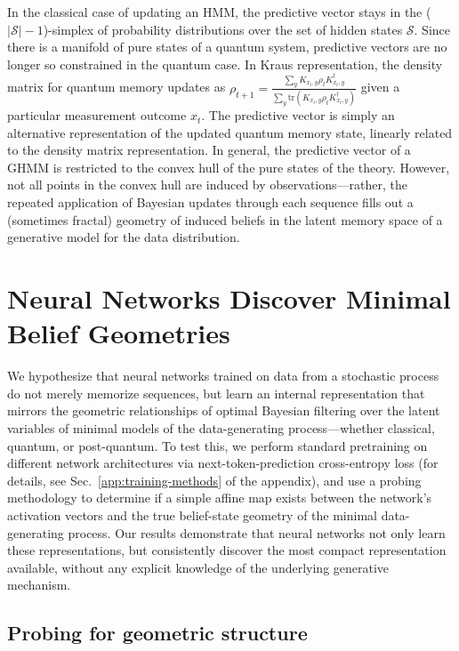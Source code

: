 \documentclass[prx,nofootinbib,onecolumn,showkeys,groupaddress,preprintnumbers,floatfix,
superscriptaddress]{revtex4-1}
\newcommand{\tr}{\text{tr}}
\begin{document}
In the classical case of updating an HMM, the predictive vector stays in the ($|\mathcal{S}|-1$)-simplex of probability distributions over the set of hidden states $\mathcal{S}$.
Since there %
is a manifold of
pure states of a quantum system,
predictive vectors are no longer so constrained in the quantum case.  In Kraus representation, the density matrix for quantum memory updates as 
$\rho_{t+1} = \frac{\sum_y K_{x_t, y} \rho_t K_{x_t, y}^\dagger}{\sum_y \tr( K_{x_t, y} \rho_t K_{x_t, y}^\dagger)}$ given a particular measurement outcome $x_t$.  The predictive vector is simply an alternative representation of the updated quantum memory state, linearly related to the density matrix representation.
In general, the predictive vector of a GHMM is restricted to the convex hull of the pure states of the theory.  However, not all points in the convex hull are induced by observations---rather, the repeated application of Bayesian updates through each sequence fills out a (sometimes fractal) geometry of induced beliefs
in the latent memory space
of a generative model 
for the data distribution.



\section{Neural Networks Discover Minimal Belief Geometries}
\label{sec:NeuralNetsDiscoverGeometry}

We hypothesize that neural networks trained on data from a stochastic process do not merely memorize sequences, but learn an internal representation that mirrors the geometric relationships of optimal Bayesian filtering over the latent variables of minimal models of the data-generating process---whether classical, quantum, or post-quantum. To test this, we perform standard pretraining on different network architectures via next-token-prediction cross-entropy loss (for details, see Sec.~\ref{app:training-methods} of the appendix), and use a probing methodology to determine if a simple affine map exists between the network's activation vectors and the true belief-state geometry of the minimal data-generating process. Our results demonstrate that neural networks not only learn these representations, but consistently discover the most compact representation available, without any explicit knowledge of the underlying generative mechanism.

\subsection{Probing for geometric structure}
\end{document}
